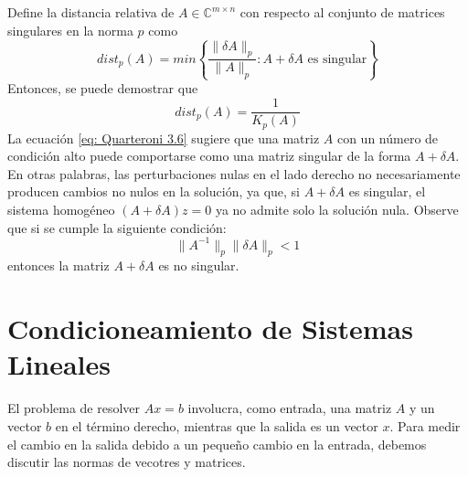 \begin{remark}
Define la distancia relativa de $A \in \mathbb{C}^{m \times n}$ con respecto al conjunto de matrices singulares en la norma $p$ como
\[ dist_p(A) = min\left\{ \frac{\|\delta A\|_p}{\|A\|_p} : A + \delta A \text{ es singular} \right\} \]
Entonces, se puede demostrar que
\begin{equation}
    \label{eq: Quarteroni 3.6}
    dist_p(A) = \frac{1}{K_p(A)}
\end{equation}
La ecuación \ref{eq: Quarteroni 3.6} sugiere que una matriz $A$ con un número de condición alto puede comportarse como una matriz singular de la forma $A + \delta A$. En otras palabras, las perturbaciones nulas en el lado derecho no necesariamente producen cambios no nulos en la solución, ya que, si $A + \delta A$ es singular, el sistema homogéneo $(A + \delta A) z = 0$ ya no admite solo la solución nula. Observe que si se cumple la siguiente condición:
\begin{equation}
    \label{eq: Quarteroni 3.7}
    \|A^{-1}\|_p \|\delta A\|_p < 1
\end{equation}
entonces la matriz $A + \delta A$ es no singular.
\end{remark}

\section{Condicioneamiento de Sistemas Lineales}
El problema de resolver $Ax = b$ involucra, como entrada, una matriz $A$ y un vector $b$ en el término derecho, mientras que la salida es un vector $x$. Para medir el cambio en la salida debido a un pequeño cambio en la entrada, debemos discutir las normas de vecotres y matrices.

